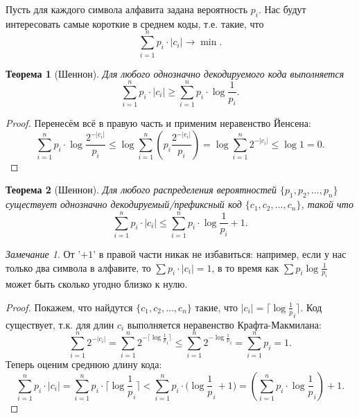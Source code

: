 \documentclass[12pt]{article}
\newcommand{\seqn}[2]{{#1}_1,{#1}_2,\dotsc,{#1}_{#2}}
\theoremstyle{definition}
\theoremstyle{plain}
\newtheorem{theorem}{Теорема}[section]
\theoremstyle{remark}
\newtheorem{remark}{Замечание}[section]
\begin{document}
Пусть для каждого символа алфавита задана вероятность $p_i$. Нас будут
интересовать самые короткие в среднем коды, т.е. такие, что 
\[
        \sum_{i=1}^n p_i\cdot|c_i| \to \min. 
\]
\begin{theorem}[Шеннон]
    Для любого однозначно декодируемого кода выполняется
    \[
        \sum_{i=1}^n p_i\cdot|c_i|\ge \sum_{i=1}^n p_i\cdot \log\frac1{p_i}. 
    \]
\end{theorem}
\begin{proof}
    Перенесём всё в правую часть и применим неравенство Йенсена:
    \[
    \sum_{i=1}^n p_i\cdot\log\frac{2^{-|c_i|}}{p_i}\le 
    \log\sum_{i=1}^n \left(p_i\frac{2^{-|c_i|}}{p_i}\right) = 
    \log\sum_{i=1}^n 2^{-|c_i|} \le \log 1 = 0. 
    \]
\end{proof}

\begin{theorem}[Шеннон]\label{thm:shannon:optcode}
    Для любого распределения вероятностей $\{\seqn{p}{n}\}$ существует
    однозначно декодируемый/префиксный код $\{\seqn{c}{n}\}$, такой что
    \[
        \sum_{i=1}^n p_i\cdot|c_i|\le \sum_{i=1}^n p_i\cdot \log\frac1{p_i} + 1. 
    \]
\end{theorem}
\begin{remark}
    От '$+1$' в правой части никак не избавиться: например, если у нас только два символа в
    алфавите, то $\sum p_i\cdot|c_i| = 1$, в то время как $\sum
    p_i\log\frac{1}{p_i}$ может быть сколько угодно близко к нулю.
\end{remark}

\begin{proof}
    Покажем, что найдутся \(\{\seqn{c}{n}\}\) такие, что $|c_i| =
    \bigl\lceil\log\frac1p_i \bigr\rceil$. Код существует, т.к. для длин $c_i$ выполняется
    неравенство Крафта-Макмилана:
    \[
        \sum_{i=1}^n 2^{-|c_i|} =  
        \sum_{i=1}^n 2^{-\lceil\log\frac1p_i \rceil} \le  
        \sum_{i=1}^n 2^{-\log\frac1p_i} = 
        \sum_{i=1}^n p_i = 1. 
    \]
    Теперь оценим среднюю длину кода:
    \[
        \sum_{i=1}^n p_i\cdot |c_i| =  
        \sum_{i=1}^n p_i\cdot \bigl\lceil\log{\textstyle\frac1p_i} \bigr\rceil < 
        \sum_{i=1}^n p_i\cdot \bigl(\log{\textstyle\frac1p_i} + 1\bigr) =
        \left(\sum_{i=1}^n p_i\cdot \log{\textstyle\frac1p_i}\right) + 1.
    \]
\end{proof}
\end{document}
